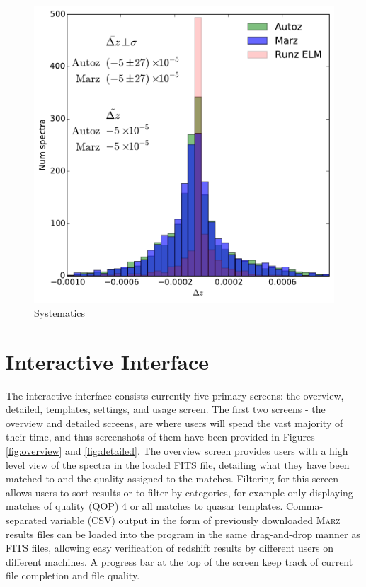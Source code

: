 \documentclass[iop]{emulateapj}
\newcommand{\marz}{\textsc{Marz}}
\begin{document}
\begin{figure}[h]
\centering
\includegraphics[width=\columnwidth]{systematic.pdf}
\caption{Systematics}
\label{fig:systematic}
\end{figure}

















\section{Interactive Interface}

The interactive interface consists currently five primary screens: the overview, detailed, templates, settings, and usage screen. The first two screens - the overview and detailed screens, are where users will spend the vast majority of their time, and thus screenshots of them have been provided in Figures \ref{fig:overview} and \ref{fig:detailed}. The overview screen provides users with a high level view of the spectra in the loaded FITS file, detailing what they have been matched to and the quality assigned to the matches. Filtering for this screen allows users to sort results or to filter by categories, for example only displaying matches of quality (QOP) 4 or all matches to quasar templates. Comma-separated variable (CSV) output in the form of previously downloaded \marz{} results files can be loaded into the program in the same drag-and-drop manner as FITS files, allowing easy verification of redshift results by different users on different machines. A progress bar at the top of the screen keep track of current file completion and file quality.\\
\end{document}
